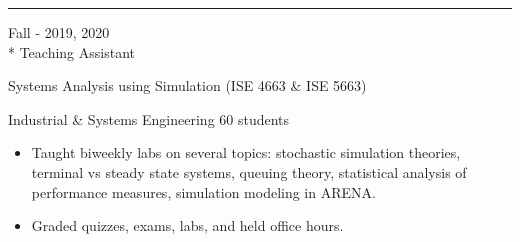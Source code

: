 \documentclass[a4paper,10pt]{article}
\newlength{\cvcolumngapwidth}
\newlength{\cvleftcolumnwidth}
\newlength{\cvrightcolumnwidth}
\newcommand{\cvsectionstyle}[1]{{\cvsectionfont\textcolor{cvsectioncolor}{#1}}}
\newcommand{\cvtitlestyle}[1]{{\large\cvtitlefont\textcolor{cvtitlecolor}{#1}}}
\newcommand{\cvdurationstyle}[1]{{\small\cvdurationfont\textcolor{cvdurationcolor}{#1}}}
\newlength{\cvafteritemskipamount}
\newlength{\cvaftersectionskipamount}
\newlength{\cvaftertitleskipamount}
\newlength{\cvparskip}
\newcommand{\cvsection}[1]{
    \begin{minipage}[t]{\cvleftcolumnwidth}
        \raggedleft\cvsectionstyle{#1}
    \end{minipage}%
    \hspace{\cvcolumngapwidth}%
    \begin{minipage}[t]{\cvrightcolumnwidth}
        \textcolor{cvrulecolor}{\rule{\cvrightcolumnwidth}{0.3mm}}
    \end{minipage}

    \vspace{\cvaftersectionskipamount}
}
\newcommand{\cvitem}[2]{
    \begin{minipage}[t]{\cvleftcolumnwidth}
        \raggedleft #1
    \end{minipage}%
    \hspace{\cvcolumngapwidth}%
    \begin{minipage}[t]{\cvrightcolumnwidth}
        \setlength{\parskip}{\cvparskip} #2
    \end{minipage}

    \vspace{\cvafteritemskipamount}
}
\newcommand{\cvtitle}[1]{
    \cvtitlestyle{#1}

    \vspace{\cvaftertitleskipamount}
    \vspace{-\cvparskip}
}
\begin{document}
\vspace{-0.15cm}


\cvsection{TEACHING EXPERIENCE}
\vspace{0.15cm}

\cvitem{
\cvdurationstyle{Fall - 2019, 2020}
\\* Teaching Assistant
}{
    \cvtitle{Systems Analysis using Simulation (ISE 4663 \& ISE 5663)}

    Industrial \& Systems Engineering \hfill{60 students}
    \vspace{0.15cm}
    
    \begin{itemize}[leftmargin=*]
    
        \item Taught biweekly labs on several topics: stochastic simulation theories, terminal vs steady state systems, queuing theory, statistical analysis of performance measures, simulation modeling in ARENA.
        \item Graded quizzes, exams, labs, and held office hours.

        
    \end{itemize}
    
}
\end{document}
